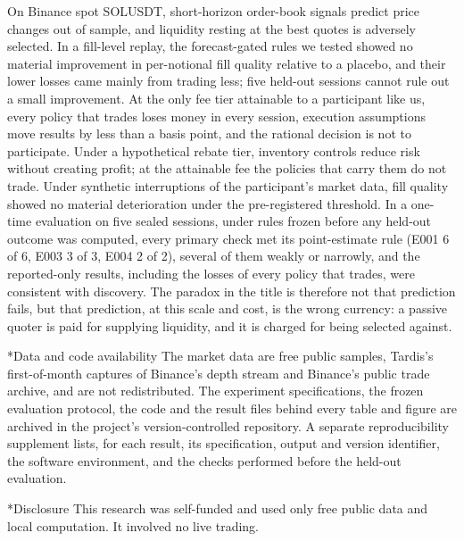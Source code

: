\documentclass[11pt]{article}
\makeatletter
\renewcommand\section{\@startsection{section}{1}{\z@}{-3.25ex\@plus -1ex \@minus -.2ex}{1.5ex \@plus .2ex}{\normalfont\large\bfseries}}
\makeatother
\begin{document}
On Binance spot SOLUSDT, short-horizon order-book signals predict price changes out of sample, and liquidity resting at the
best quotes is adversely selected. In a fill-level replay, the forecast-gated rules we tested showed no material improvement in
per-notional fill quality relative to a placebo, and their lower losses came mainly from trading less; five held-out
sessions cannot rule out a small improvement. At the only fee tier attainable to a participant like us, every policy that
trades loses money in every session, execution assumptions move results by less than a basis point, and the rational
decision is not to participate. Under a hypothetical rebate tier, inventory controls reduce risk without creating profit;
at the attainable fee the policies that carry them do not trade. Under synthetic interruptions of the participant's market
data, fill quality showed no material deterioration under the pre-registered threshold. In a one-time evaluation on five
sealed sessions, under rules frozen before any held-out outcome was computed, every primary check met its point-estimate rule (E001 6 of 6, E003 3 of 3,
E004 2 of 2), several of them weakly or narrowly, and the reported-only results, including the losses of every policy
that trades, were consistent with discovery. The paradox in
the title is therefore not that prediction fails, but that prediction, at this scale and cost, is the wrong currency: a
passive quoter is paid for supplying liquidity, and it is charged for being selected against.

\section*{Data and code availability}
The market data are free public samples, Tardis's first-of-month captures of Binance's depth stream and Binance's public
trade archive, and are not redistributed. The experiment specifications, the frozen evaluation protocol, the code and
the result files behind every table and figure are archived in the project's version-controlled repository. A separate
reproducibility supplement lists, for each result, its specification, output and version identifier, the software
environment, and the checks performed before the held-out evaluation.

\section*{Disclosure}
This research was self-funded and used only free public data and local computation. It involved no live trading.



\end{document}
